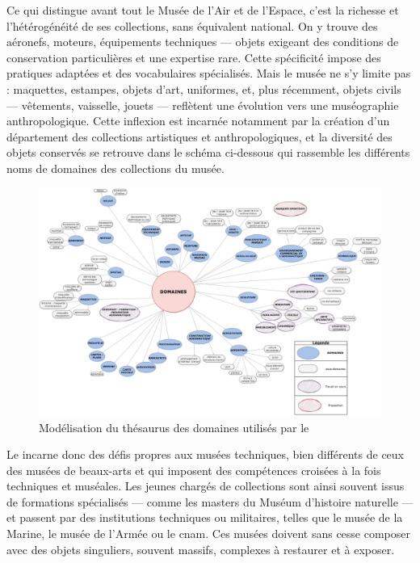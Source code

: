 Ce qui distingue avant tout le Musée de l’Air et de l’Espace, c’est la richesse et l’hétérogénéité de ses collections, sans équivalent national. On y trouve des aéronefs, moteurs, équipements techniques — objets exigeant des conditions de conservation particulières et une expertise rare. Cette spécificité impose des pratiques adaptées et des vocabulaires spécialisés. Mais le musée ne s’y limite pas : maquettes, estampes, objets d’art, uniformes, et, plus récemment, objets civils — vêtements, vaisselle, jouets — reflètent une évolution vers une muséographie anthropologique. Cette inflexion est incarnée notamment par la création d'un département des collections artistiques et anthropologiques, et la diversité des objets conservés se retrouve dans le schéma ci-dessous qui rassemble les différents noms de domaines des collections du musée.

\begin{figure}[htbp]
	\centering
	\includegraphics[width=\linewidth]{img/MODEL_domaines.png}
	\caption{Modélisation du thésaurus des domaines utilisés par le \mae}
	\label{fig:model_domaines}
\end{figure}

Le \mae incarne donc des défis propres aux musées techniques, bien différents de ceux des musées de beaux-arts et qui imposent des compétences croisées à la fois techniques et muséales. Les jeunes chargés de collections sont ainsi souvent issus de formations spécialisés — comme les masters du Muséum d’histoire naturelle — et passent par des institutions techniques ou militaires, telles que le musée de la Marine, le musée de l’Armée ou le \ac{cnam}. Ces musées doivent sans cesse composer avec des objets singuliers, souvent massifs, complexes à restaurer et à exposer.


